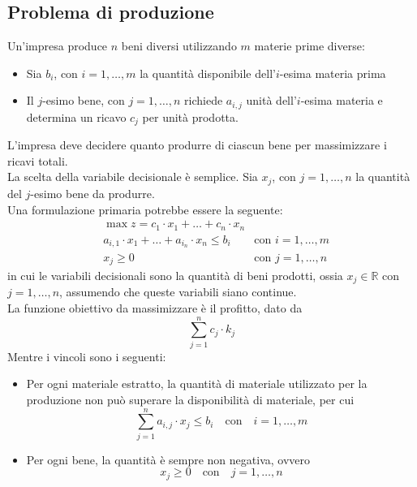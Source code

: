 \documentclass[a4paper]{extarticle}
\begin{document}
\subsection{Problema di produzione}
Un'impresa produce $n$ beni diversi utilizzando $m$ materie prime diverse:
\begin{itemize}
    \item Sia $b_i$, con $i = 1,\dots,m$ la quantità disponibile dell'$i$-esima materia prima
    \item Il $j$-esimo bene, con $j=1,\dots,n$ richiede $a_{i,j}$ unità dell'$i$-esima materia e determina un ricavo $c_j$ per unità prodotta.
\end{itemize}
L'impresa deve decidere quanto produrre di ciascun bene per massimizzare i ricavi totali.\\
La scelta della variabile decisionale è semplice. Sia $x_j$, con $j = 1,\dots,n$ la quantità del $j$-esimo bene da produrre.\\
Una formulazione primaria potrebbe essere la seguente:
\begin{align*}
    &\max z = c_1 \cdot x_1 + \dots + c_n \cdot x_n &\\
    &a_{i,1} \cdot x_1 + \dots + a_{i_n} \cdot x_n \leq b_i & \text{con } i=1,\dots,m\\
    &x_j \geq 0 & \text{con } j=1,\dots,n
\end{align*}
in cui le variabili decisionali sono la quantità di beni prodotti, ossia $x_j \in \mathbb{R}$ con $j=1,\dots,n$, assumendo che queste variabili siano continue.\\
La funzione obiettivo da massimizzare è il profitto, dato da
\[\sum_{j=1}^n c_j \cdot k_j\]
Mentre i vincoli sono i seguenti:
\begin{itemize}
    \item Per ogni materiale estratto, la quantità di materiale utilizzato per la produzione non può superare la disponibilità di materiale, per cui
    \[\sum_{j=1}^n a_{i,j} \cdot x_j \leq b_i \hspace{1em} \text{con} \hspace{1em} i=1,\dots,m\]
    \item Per ogni bene, la quantità è sempre non negativa, ovvero
    \[x_j \geq 0 \hspace{1em} \text{con} \hspace{1em} j=1,\dots,n\]
\end{itemize}
\end{document}
